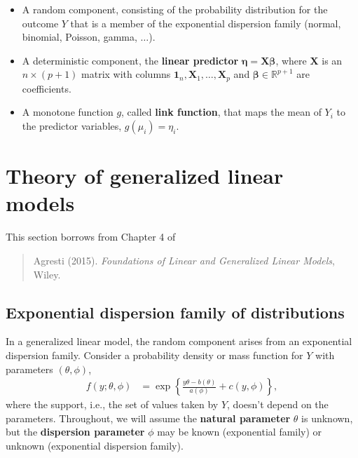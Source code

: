 \documentclass[
  11pt,
  letterpaper,
]{book}
\providecommand{\tightlist}{%
  \setlength{\itemsep}{0pt}\setlength{\parskip}{0pt}}
\theoremstyle{definition}
\theoremstyle{definition}
\theoremstyle{definition}
\theoremstyle{definition}
\theoremstyle{remark}
\begin{document}
\begin{itemize}
\tightlist
\item
  A random component, consisting of the probability distribution for the outcome \(Y\) that is a member of the exponential dispersion family (normal, binomial, Poisson, gamma, \(\ldots\)).
\item
  A deterministic component, the \textbf{linear predictor} \(\boldsymbol{\eta}=\mathbf{X} \boldsymbol{\beta}\), where \(\mathbf{X}\) is an \(n\times (p+1)\) matrix with columns \(\mathbf{1}_n, \mathbf{X}_1, \ldots, \mathbf{X}_p\) and \(\boldsymbol{\beta} \in \mathbb{R}^{p+1}\) are coefficients.
\item
  A monotone function \(g\), called \textbf{link function}, that maps the mean of \(Y_i\) to the predictor variables, \(g(\mu_i)=\eta_i\).
\end{itemize}

\hypertarget{theory-of-generalized-linear-models}{%
\section{Theory of generalized linear models}\label{theory-of-generalized-linear-models}}

This section borrows from Chapter 4 of

\begin{quote}
Agresti (2015). \emph{Foundations of Linear and Generalized Linear Models}, Wiley.
\end{quote}

\hypertarget{exponential-dispersion-family-of-distributions}{%
\subsection{Exponential dispersion family of distributions}\label{exponential-dispersion-family-of-distributions}}

In a generalized linear model, the random component arises from an
exponential dispersion family. Consider a probability density or mass
function for \(Y\) with parameters \((\theta, \phi)\),
\begin{align}
f(y; \theta, \phi)&= \exp \left\{  \frac{y \theta -b(\theta)}{a(\phi)} + c(y, \phi)\right\}, 
\label{eq:expofam}
\end{align}
where the support, i.e., the set of values taken by \(Y\),
doesn't depend on the parameters. Throughout, we will assume the
\textbf{natural parameter} \(\theta\) is unknown, but the \textbf{dispersion
parameter} \(\phi\) may be known (exponential family) or unknown
(exponential dispersion family).
\end{document}
